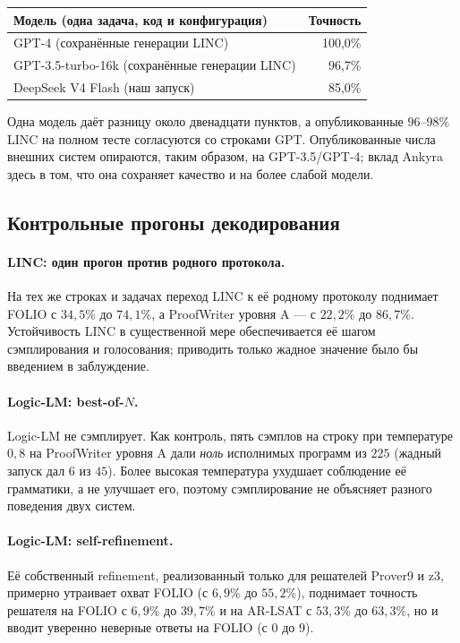 \documentclass[11pt,a4paper]{article}
\begin{document}
\begin{center}
\small
\begin{tabular}{lr}
\toprule
\textbf{Модель (одна задача, код и конфигурация)} & \textbf{Точность} \\
\midrule
GPT-4 (сохранённые генерации LINC) & 100{,}0\% \\
GPT-3.5-turbo-16k (сохранённые генерации LINC) & 96{,}7\% \\
DeepSeek V4 Flash (наш запуск) & 85{,}0\% \\
\bottomrule
\end{tabular}
\end{center}

Одна модель даёт разницу около двенадцати пунктов, а опубликованные $96$--$98\%$ LINC на полном тесте согласуются со строками GPT. Опубликованные
числа внешних систем опираются, таким образом, на GPT-3.5/GPT-4; вклад Ankyra здесь в том, что она сохраняет качество и на более слабой модели.

\subsection{Контрольные прогоны декодирования}
\label{sec:comparison-ablations}

\paragraph{LINC: один прогон против родного протокола.} На тех же строках и задачах переход LINC к её родному протоколу поднимает FOLIO с $34{,}5\%$ до $74{,}1\%$,
а ProofWriter уровня A — с $22{,}2\%$ до $86{,}7\%$. Устойчивость LINC в существенной мере обеспечивается её шагом сэмплирования и голосования;
приводить только жадное значение было бы введением в заблуждение.

\paragraph{Logic-LM: best-of-$N$.} Logic-LM не сэмплирует. Как контроль, пять сэмплов на строку при температуре $0{,}8$ на ProofWriter уровня A
дали \emph{ноль} исполнимых программ из $225$ (жадный запуск дал $6$ из $45$). Более высокая температура ухудшает соблюдение её грамматики,
а не улучшает его, поэтому сэмплирование не объясняет разного поведения двух систем.

\paragraph{Logic-LM: self-refinement.} Её собственный refinement, реализованный только для решателей Prover9 и z3, примерно утраивает охват FOLIO
(с $6{,}9\%$ до $55{,}2\%$), поднимает точность решателя на FOLIO с $6{,}9\%$ до $39{,}7\%$ и на AR-LSAT с $53{,}3\%$ до $63{,}3\%$, но и вводит
уверенно неверные ответы на FOLIO (с $0$ до $9$).
\end{document}
